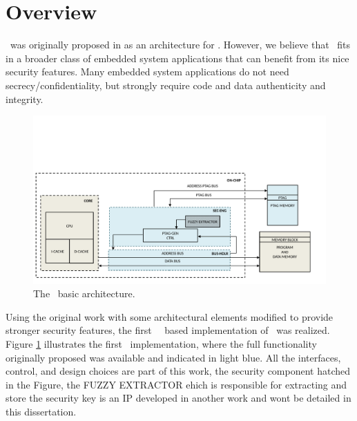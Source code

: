\section{Overview}
\label{sec:overviewarch}

\cshia~was originally proposed in \cite{Hoffman2015} as an architecture for \iot. However, we believe that \cshia~fits in a broader class of embedded system applications that can benefit from its nice security features. Many embedded system applications do not need secrecy\slash{}confidentiality, but strongly require code and data authenticity and integrity. 
\begin{figure}[!ht]
    \centering
    \includegraphics[width=\textwidth]{figures/pdf/CSHIA_basic.pdf}
    \caption{The \cshia~basic architecture.}
    \label{fig:cshia}
\end{figure}
Using the original work with some architectural elements modified to provide stronger security features, the first \leon~\fpga~based implementation of \cshia~was realized. Figure \ref{fig:cshia} illustrates  the first \cshia~implementation, where the full functionality originally proposed was available and indicated in light blue. All the interfaces, control, and design choices are part of this work, the security component hatched in the Figure, the FUZZY EXTRACTOR  ehich is responsible for extracting and store the security key is an IP developed  in another work and wont be detailed in this dissertation.    

